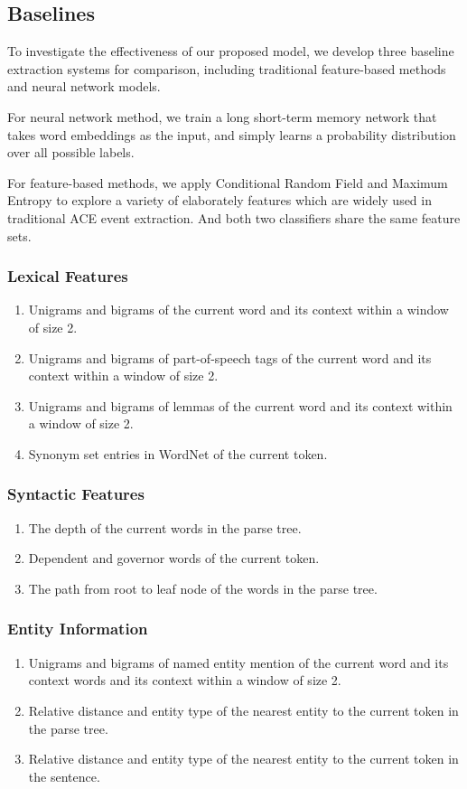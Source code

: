 \documentclass{article}
\begin{document}
\subsection{Baselines}
To investigate the effectiveness of our proposed model, we develop three baseline extraction systems for comparison, including traditional feature-based methods and neural network models. 

For neural network method, we train a long short-term memory network that takes word embeddings as the input, and simply learns a probability distribution over all possible labels.

For feature-based methods, we apply Conditional Random Field \cite{lafferty2001conditional} and Maximum Entropy \cite{berger1996maximum} to explore a variety of elaborately features which are widely used in traditional ACE event extraction. And both two classifiers share the same feature sets.

\subsubsection{Lexical Features}
\begin{enumerate}
	\item Unigrams and bigrams of the current word and its context within a window of size 2.
	\item Unigrams and bigrams of part-of-speech tags of the current word and its context within a window of size 2.
	\item Unigrams and bigrams of lemmas of the current word and its context within a window of size 2.
	\item Synonym set entries in WordNet \cite{miller1995wordnet} of the current token.
\end{enumerate}

\subsubsection{Syntactic Features}
\begin{enumerate}
	\item The depth of the current words in the parse tree.
	\item Dependent and governor words of the current token.
	\item The path from root to leaf node of the words in the parse tree.
\end{enumerate}

\subsubsection{Entity Information}
\begin{enumerate}
	\item Unigrams and bigrams of named entity mention of the current word and its context words and its context within a window of size 2.
	\item Relative distance and entity type of the nearest entity to the current token in the parse tree.
	\item Relative distance and entity type of the nearest entity to the current token in the sentence.
\end{enumerate}
\end{document}
